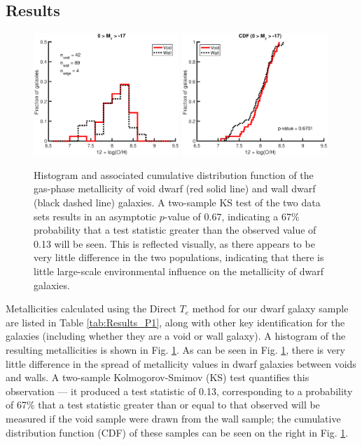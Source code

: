 \subsection{Results}

\begin{figure}
    \centering
    \includegraphics[width=0.49\textwidth]{Images/Paper1/1sig_dwarf_SF_t3_12logOH_hist}
    \includegraphics[width=0.49\textwidth]{Images/Paper1/1sig_dwarf_SF_t3_12logOH_CDF}
    \caption[Metallicity distribution of 135 dwarf galaxy sample]{Histogram and 
    associated cumulative distribution function of the gas-phase metallicity of 
    void dwarf (red solid line) and wall dwarf (black dashed line) galaxies.  A 
    two-sample KS test of the two data sets results in an asymptotic $p$-value 
    of 0.67, indicating a 67\% probability that a test statistic greater than 
    the observed value of 0.13 will be seen.  This is reflected visually, as 
    there appears to be very little difference in the two populations, 
    indicating that there is little large-scale environmental influence on the 
    metallicity of dwarf galaxies.}
    \label{fig:met1sig}
\end{figure}

Metallicities calculated using the Direct $T_e$ method for our dwarf galaxy 
sample are listed in Table \ref{tab:Results_P1}, along with other key 
identification for the galaxies (including whether they are a void or wall 
galaxy).  A histogram of the resulting metallicities is shown in Fig. 
\ref{fig:met1sig}.  As can be seen in Fig. \ref{fig:met1sig}, there is very 
little difference in the spread of metallicity values in dwarf galaxies between 
voids and walls.  A two-sample Kolmogorov-Smimov (KS) test quantifies this 
observation --- it produced a test statistic of 0.13, corresponding to a 
probability of 67\% that a test statistic greater than or equal to that observed 
will be measured if the void sample were drawn from the wall sample; the 
cumulative distribution function (CDF) of these samples can be seen on the right 
in Fig. \ref{fig:met1sig}.

